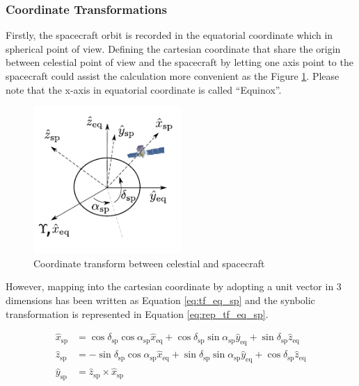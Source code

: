 \subsubsection{Coordinate Transformations}

Firstly, the spacecraft orbit is recorded in the equatorial coordinate
which in spherical point of view. Defining the cartesian coordinate
that share the origin between celestial point of view and the spacecraft 
by letting one axis point to the spacecraft could assist the calculation
more convenient as the Figure \ref{fig:coord_eq_sp}. Please note that 
the x-axis in equatorial coordinate is called ``Equinox''.

\begin{figure}[h]
    \centering
    \includegraphics[width=0.5\textwidth]{content/methodology/figures/coord_eq_sp.pdf}
    \caption{Coordinate transform between celestial and spacecraft}
    \label{fig:coord_eq_sp}
\end{figure}


However, mapping into the cartesian 
coordinate by adopting a unit vector in 3 dimensions has been written
as Equation \ref{eq:tf_eq_sp} and the synbolic transformation is 
represented in Equation \ref{eq:rep_tf_eq_sp}.

\begin{equation}
    \begin{split}
    \hat{x}_\text{sp} &= \cos\delta_\text{sp}\cos\alpha_\text{sp}\hat{x}_\text{eq} + \cos\delta_\text{sp}\sin\alpha_\text{sp}\hat{y}_\text{eq} + \sin\delta_\text{sp}\hat{z}_\text{eq}\\
    \hat{z}_\text{sp} &= - \sin\delta_\text{sp}\cos\alpha_\text{sp}\hat{x}_\text{eq} + \sin\delta_\text{sp}\sin\alpha_\text{sp}\hat{y}_\text{eq} + \cos\delta_\text{sp}\hat{z}_\text{eq} \\
    \hat{y}_\text{sp} &= \hat{z}_\text{sp} \times \hat{x}_\text{sp}
    \end{split}
    \label{eq:tf_eq_sp}
\end{equation}

